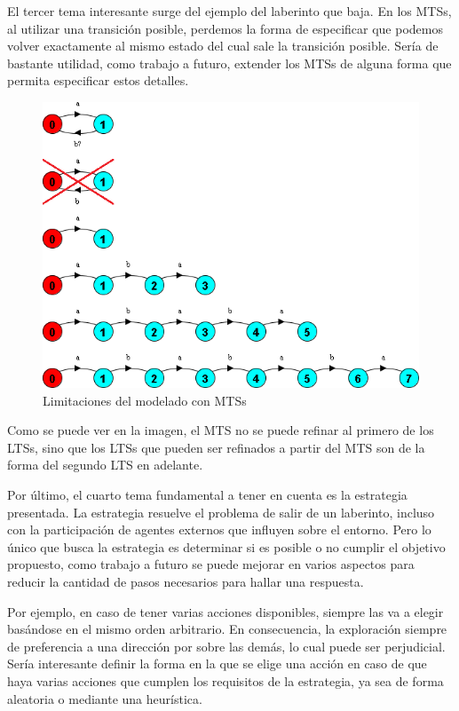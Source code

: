 \vspace{\baselineskip}
El tercer tema interesante surge del ejemplo del laberinto que baja. En los MTSs, al utilizar una transición posible, perdemos la forma 
de especificar que podemos volver exactamente al mismo estado del cual sale la transición posible. Sería de bastante utilidad, como 
trabajo a futuro, extender los MTSs de alguna forma que permita especificar estos detalles.

\begin{figure}[H]
	\centering
		\includegraphics[width=1.0\textwidth]{Imagenes/Otros/Limitaciones.png}
	\caption{Limitaciones del modelado con MTSs}
	\label{fig:Limitaciones}
\end{figure}

Como se puede ver en la imagen, el MTS no se puede refinar al primero de los LTSs, sino que los LTSs que pueden ser refinados a partir 
del MTS son de la forma del segundo LTS en adelante.

\vspace{\baselineskip}
Por último, el cuarto tema fundamental a tener en cuenta es la estrategia presentada. La estrategia resuelve el problema de salir de 
un laberinto, incluso con la participación de agentes externos que influyen sobre el entorno. Pero lo único que busca la estrategia 
es determinar si es posible o no cumplir el objetivo propuesto, como trabajo a futuro se puede mejorar en varios aspectos para reducir 
la cantidad de pasos necesarios para hallar una respuesta.

\vspace{\baselineskip}
Por ejemplo, en caso de tener varias acciones disponibles, siempre las va a elegir basándose en el mismo orden arbitrario. En consecuencia, 
la exploración siempre de preferencia a una dirección por sobre las demás, lo cual puede ser perjudicial. Sería interesante definir 
la forma en la que se elige una acción en caso de que haya varias acciones que cumplen los requisitos de la estrategia, ya sea de forma 
aleatoria o mediante una heurística.

